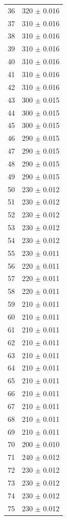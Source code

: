 \documentclass[a4paper]{instrumentacao}
\begin{document}
\begin{longtable}{cc}
 36 & 320 $\pm$ 0.016 \\
 37 & 310 $\pm$ 0.016 \\
 38 & 310 $\pm$ 0.016 \\
 39 & 310 $\pm$ 0.016 \\
 40 & 310 $\pm$ 0.016 \\
 41 & 310 $\pm$ 0.016 \\
 42 & 310 $\pm$ 0.016 \\
 43 & 300 $\pm$ 0.015 \\
 44 & 300 $\pm$ 0.015 \\
 45 & 300 $\pm$ 0.015 \\
 46 & 290 $\pm$ 0.015 \\
 47 & 290 $\pm$ 0.015 \\
 48 & 290 $\pm$ 0.015 \\
 49 & 290 $\pm$ 0.015 \\
 50 & 230 $\pm$ 0.012 \\
 51 & 230 $\pm$ 0.012 \\
 52 & 230 $\pm$ 0.012 \\
 53 & 230 $\pm$ 0.012 \\
 54 & 230 $\pm$ 0.012 \\
 55 & 230 $\pm$ 0.011 \\
 56 & 220 $\pm$ 0.011 \\
 57 & 220 $\pm$ 0.011 \\
 58 & 220 $\pm$ 0.011 \\
 59 & 210 $\pm$ 0.011 \\
 60 & 210 $\pm$ 0.011 \\
 61 & 210 $\pm$ 0.011 \\
 62 & 210 $\pm$ 0.011 \\
 63 & 210 $\pm$ 0.011 \\
 64 & 210 $\pm$ 0.011 \\
 65 & 210 $\pm$ 0.011 \\
 66 & 210 $\pm$ 0.011 \\
 67 & 210 $\pm$ 0.011 \\
 68 & 210 $\pm$ 0.011 \\
 69 & 210 $\pm$ 0.011 \\
 70 & 200 $\pm$ 0.010 \\
 71 & 240 $\pm$ 0.012 \\
 72 & 230 $\pm$ 0.012 \\
 73 & 230 $\pm$ 0.012 \\
 74 & 230 $\pm$ 0.012 \\
 75 & 230 $\pm$ 0.012 \\

\end{longtable}
\end{document}
